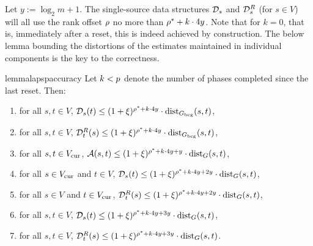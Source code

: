 \documentclass[11pt,letterpaper]{article}
\theoremstyle{plain}
\newcommand{\dist}{\mathrm{dist}}
\begin{document}
Let $y:=\log_2{m}+1$.
The single-source data structures $\mathcal{D}_s$ and $\mathcal{D}^{R}_s$ (for $s\in V$) will all use the rank
offset $\rho$ no more than $\rho^*+k\cdot 4y$.
Note that for $k=0$, that is, immediately after a reset, this is indeed achieved by construction.
The below lemma bounding the distortions of the estimates maintained in individual components
is the key to the correctness.

\begin{restatable}{lemma}{lapspaccuracy}\label{l:apsp-accuracy}
Let $k< p$ denote the number of phases completed since the last reset. Then:
  \begin{enumerate}[label=(\roman*)]
\item for all $s,t\in V$, $\dsfrom_s(t)\leq (1+\epsp)^{\roff^*+k\cdot 4y}\cdot \dist_{\Gbeg}(s,t)$,
\item for all $s,t\in V$, $\dsto_t(s)\leq (1+\epsp)^{\roff^*+k\cdot 4y}\cdot \dist_{\Gbeg}(s,t)$,
\item for all $s,t\in V_{\mathrm{cur}}$, $\apsp(s,t)\leq (1+\epsp)^{\roff^*+k\cdot 4y+y}\cdot \dist_{G}(s,t)$,
\item for all $s\in V_{\mathrm{cur}}$ and $t\in V$, $\dsfrom_s(t)\leq (1+\epsp)^{\roff^*+k\cdot 4y+2y}\cdot \dist_G(s,t)$,
\item for all $s\in V$ and $t\in V_{\mathrm{cur}}$, $\dsto_t(s)\leq (1+\epsp)^{\roff^*+k\cdot 4y+2y}\cdot \dist_G(s,t)$,
\item for all $s,t\in V$, $\dsfrom_s(t)\leq (1+\epsp)^{\roff^*+k\cdot 4y+3y}\cdot \dist_G(s,t)$,
\item for all $s,t\in V$, $\dsto_t(s)\leq (1+\epsp)^{\roff^*+k\cdot 4y+3y}\cdot \dist_G(s,t)$.
\end{enumerate}
\end{restatable}
\end{document}
